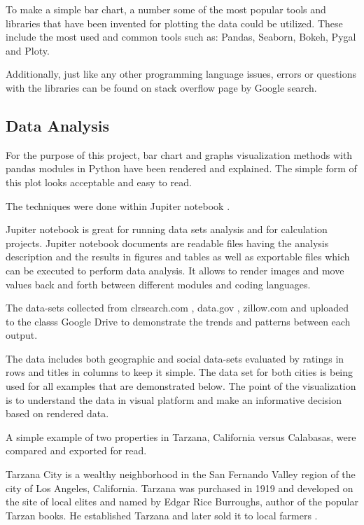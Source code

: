 \documentclass[sigconf]{acmart}
\begin{document}
To make a simple bar chart, a number some of the most popular tools and libraries that have been invented for plotting the data could be utilized. These include the most used and common tools such as: Pandas, Seaborn, Bokeh,  Pygal and Ploty.

Additionally, just like any other programming language issues, errors or questions with the libraries can be found on stack overflow page by Google search.

\subsection{Data Analysis}

For the purpose of this project, bar chart and graphs visualization methods with pandas modules in Python have been rendered and explained.
The simple form of this plot looks acceptable and easy to read. 

The techniques were done within Jupiter notebook \cite{md}. 

Jupiter notebook is great for running data sets analysis and for calculation projects. Jupiter notebook documents are readable files having the analysis description and the results in figures and tables as well as exportable files which can be executed to perform data analysis. It allows to render images and move values back and forth between different modules and coding languages.

The data-sets collected from clrsearch.com \cite{clr}, data.gov \cite{data.gov}, zillow.com \cite{zillow} and uploaded to the class\textquotesingle s Google Drive to demonstrate the trends and patterns between each output. 

The data includes both geographic and social data-sets evaluated by ratings in rows and titles in columns to keep it simple. The data set for both cities is being used for all examples that are demonstrated below. 
The point of the visualization is to understand the data in visual platform and make an informative decision based on rendered data.

A simple example of two properties in Tarzana, California versus Calabasas, were compared and exported for read. 

Tarzana City is a wealthy neighborhood in the San Fernando Valley region of the city of Los Angeles, California. Tarzana was purchased in 1919 and developed on the site of local elites and named by Edgar Rice Burroughs, author of the popular Tarzan books. He established Tarzana and later sold it to local farmers \cite{wiki}.
\end{document}
